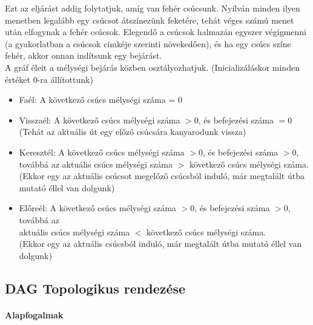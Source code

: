 \documentclass[margin=0px]{article}
\begin{document}
    \noindent Ezt az eljárást addig folytatjuk, amíg van fehér csúcsunk. Nyilván minden ilyen menetben legalább egy csúcsot átszínezünk feketére, tehát véges számú menet után elfogynak a fehér csúcsok. Elegendő a csúcsok halmazán egyszer végigmenni (a gyakorlatban a csúcsok címkéje szerinti növekedően), és ha egy csúcs színe fehér, akkor onnan indítsunk egy bejárást.\\
	
    \noindent A gráf éleit a mélységi bejárás közben osztályozhatjuk. (Inicializáláskor minden értéket 0-ra állítottunk)
    \begin{itemize}
        \item Faél: A következő csúcs mélységi száma = 0
        \item Visszaél: A következő csúcs mélységi száma $ > 0$, és befejezési száma $= 0$\\
        (Tehát az aktuális út egy előző csúcsára kanyarodunk vissza)
        \item Keresztél: A következő csúcs mélységi száma $ > 0$, és befejezési száma $ > 0$, továbbá az aktuális csúcs mélységi száma $>$ következő csúcs mélységi száma.\\
        (Ekkor egy az aktuális csúcsot megelőző csúcsból induló, már megtalált útba mutató éllel van dolgunk)
        \item Előreél: A következő csúcs mélységi száma $ > 0$, és befejezési száma $ > 0$, továbbá az \\
        aktuális csúcs mélységi száma $ < $ következő csúcs mélységi száma.\\
        (Ekkor egy az aktuális csúcsból induló, már megtalált útba mutató éllel van dolgunk)
	\end{itemize}
	
    \subsection*{DAG Topologikus rendezése\\}

	\paragraph*{Alapfogalmak}
\end{document}
